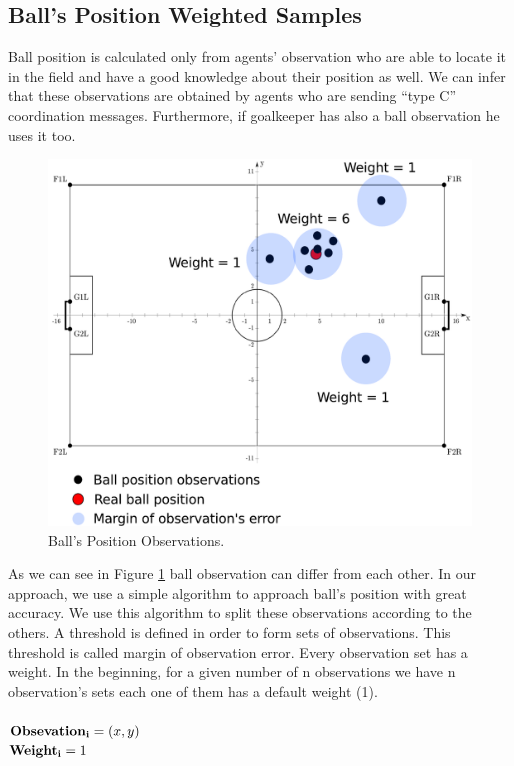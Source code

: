 \subsection{Ball's Position Weighted Samples}
Ball position is calculated only from agents' observation who are able to locate it in the field and have a good knowledge about their position as well. We can infer that these observations are obtained by agents who are sending ``type C'' coordination messages. Furthermore, if goalkeeper has also a ball observation he uses it too.
\begin{figure}[htb!]
\centering
  \includegraphics[scale=0.5]{Chapter4/figures/Ball.pdf}
  \caption{Ball's Position Observations.} 
  \label{fig:Ball}
\end{figure}
As we can see in Figure \ref{fig:Ball} ball observation can differ from each other. In our approach, we use a simple algorithm to approach ball's position with great accuracy. We use this algorithm to split these observations according to the others. A threshold is defined in order to form sets of observations. This threshold is called margin of observation error. Every observation set has a weight. In the beginning, for a given number of n observations we have n observation's sets each one of them has a default weight (1).\\
\\
${\bf Obsevation_{i} } = (x,y)$\\
${\bf Weight_{i}} = 1$\\
